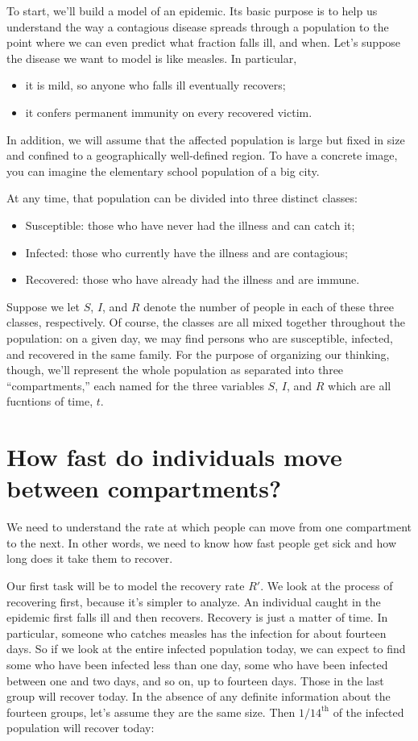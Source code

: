 \documentclass
[justified,nohyper]
{tufte-handout}
\begin{document}
To start, we'll build a model of an epidemic. Its basic purpose is to help us understand the way a contagious disease spreads through a population to the point where we can even predict what fraction falls ill, and when. Let's suppose the disease we want to model is like measles. In particular,
\begin{itemize}
	\item it is mild, so anyone who falls ill eventually recovers;
	\item it confers permanent immunity on every recovered victim.
\end{itemize}

In addition, we will assume that the affected population is large but fixed in size and confined to a geographically well-defined region. To have a concrete image, you can imagine the elementary school population of a big city.

At any time, that population can be divided into three distinct classes:
\begin{itemize}
	\item Susceptible: those who have never had the illness and can catch it;
	\item Infected: those who currently have the illness and are contagious;
	\item Recovered: those who have already had the illness and are immune.
\end{itemize}

Suppose we let $S$, $I$, and $R$ denote the number of people in each of these three classes, respectively. Of course, the classes are all mixed together throughout the population: on a given day, we may find persons who are susceptible, infected, and recovered in the same family. For the purpose of organizing our thinking, though, we'll represent the whole population as separated into three ``compartments,'' each named for the three variables $S$, $I$, and $R$ which are all fucntions of time, $t$.

\section{How fast do individuals move between compartments?} 
We need to understand the rate at which people can move from one compartment to the next. In other words, we need to know how fast people get sick and how long does it take them to recover.

Our first task will be to model the recovery rate $R'$. We look at the process of recovering first, because it's simpler to analyze. An individual caught in the epidemic first falls ill and then recovers. Recovery is just a matter of time. In particular, someone who catches measles has the infection for about fourteen days. So if we look at the entire infected population today, we can expect to find some who have been infected less than one day, some who have been infected between one and two days, and so on, up to fourteen days. Those in the last group will recover today. In the absence of any definite information about the fourteen groups, let's assume they are the same size. Then $1/14^{\text{th}}$ of the infected population will recover today:
\end{document}
